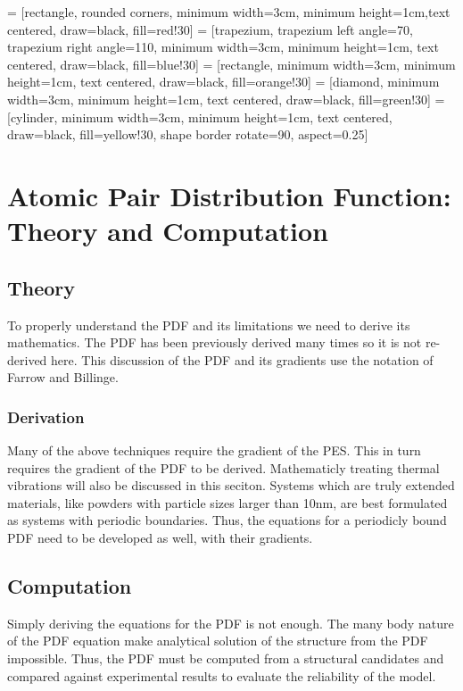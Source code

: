 \graphicspath{{./pdf/figures/}}
 = [rectangle, rounded corners, minimum width=3cm, minimum height=1cm,text centered, draw=black, fill=red!30]
 = [trapezium, trapezium left angle=70, trapezium right angle=110, minimum width=3cm, minimum height=1cm, text centered, draw=black, fill=blue!30]
 = [rectangle, minimum width=3cm, minimum height=1cm, text centered, draw=black, fill=orange!30]
 = [diamond, minimum width=3cm, minimum height=1cm, text centered, draw=black, fill=green!30]
\usetikzlibrary{shapes.geometric}
 = [cylinder, minimum width=3cm, minimum height=1cm, text centered, draw=black, fill=yellow!30, shape border rotate=90, aspect=0.25]

\chapter{Atomic Pair Distribution Function: \\Theory and Computation} \label{ch:pdf}
\section{Theory}
To properly understand the PDF and its limitations we need to derive its mathematics.
The PDF has been previously derived many times so it is not re-derived here.
This discussion of the PDF and its gradients use the notation of Farrow and Billinge. \cite{Farrow2009}
\subsection{Derivation}
Many of the above techniques require the gradient of the PES.
This in turn requires the gradient of the PDF to be derived.
Mathematicly treating thermal vibrations will also be discussed in this seciton.
Systems which are truly extended materials, like powders with particle sizes larger than 10nm, are best formulated as systems with periodic boundaries.
Thus, the equations for a periodicly bound PDF need to be developed as well, with their gradients.


\section{Computation} \label{sec:comp}
Simply deriving the equations for the PDF is not enough.
The many body nature of the PDF equation make analytical solution of the structure from the PDF impossible.
Thus, the PDF must be computed from a structural candidates and compared against experimental results to evaluate the reliability of the model.

